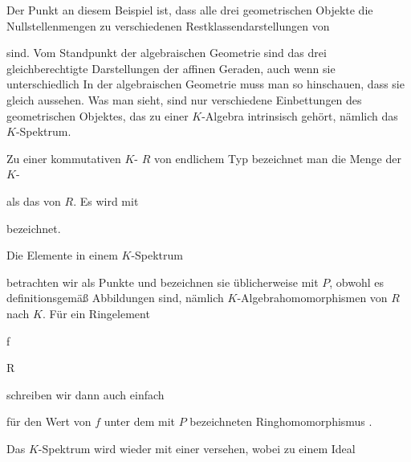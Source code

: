 Der Punkt an diesem Beispiel ist, dass alle drei geometrischen Objekte die Nullstellenmengen zu verschiedenen Restklassendarstellungen von

 sind. Vom Standpunkt der algebraischen Geometrie sind das drei gleichberechtigte Darstellungen der affinen Geraden, auch wenn sie unterschiedlich  In der algebraischen Geometrie muss man so hinschauen, dass sie gleich aussehen. Was man sieht, sind nur verschiedene Einbettungen des  geometrischen Objektes, das zu einer $K$-Algebra intrinsisch gehört, nämlich das $K$-Spektrum.



{}

{


Zu einer kommutativen
$K$-
$R$ von endlichem Typ bezeichnet man die Menge der
$K$-


 {  }


als das
von $R$. Es wird mit

 bezeichnet.


}


Die  Elemente in einem $K$-Spektrum

 betrachten wir als Punkte und bezeichnen sie üblicherweise mit $P$, obwohl es definitionsgemäß Abbildungen sind, nämlich $K$-Algebrahomomorphismen von $R$ nach $K$. Für ein Ringelement


\mavergleichskette

{\vergleichskette

{ f
}

{ \in }{ R
}

{  }{
}

{    }{
}

{   }{
}

}
{}{}{}
schreiben wir dann auch einfach

 {} {}
für den Wert von $f$ unter dem mit $P$ bezeichneten Ringhomomorphismus
 {} {.}


Das $K$-Spektrum wird wieder mit einer  {} versehen, wobei zu einem Ideal


